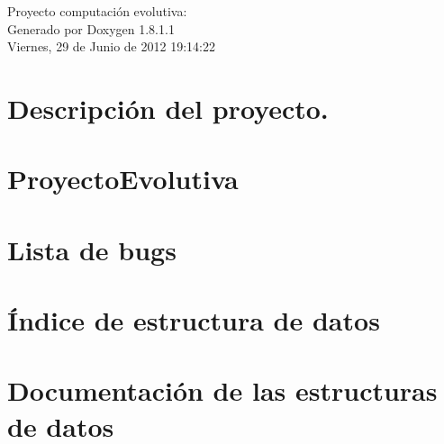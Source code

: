 \documentclass{book}
\begin{document}
\hypersetup{pageanchor=false,citecolor=blue}
\begin{titlepage}
\vspace*{7cm}
\begin{center}
{\Large Proyecto computación evolutiva\-: }\\
\vspace*{1cm}
{\large Generado por Doxygen 1.8.1.1}\\
\vspace*{0.5cm}
{\small Viernes, 29 de Junio de 2012 19:14:22}\\
\end{center}
\end{titlepage}
\clearemptydoublepage
{}
\tableofcontents
\clearemptydoublepage
{}
\hypersetup{pageanchor=true,citecolor=blue}
\chapter{Descripción del proyecto.}
\label{index}\hypertarget{index}{}
\chapter{Proyecto\-Evolutiva}
\label{md_README}
\hypertarget{md_README}{}

\chapter{Lista de bugs}
\label{bug}
\hypertarget{bug}{}

\chapter{Índice de estructura de datos}

\chapter{Documentación de las estructuras de datos}








\printindex
\end{document}
